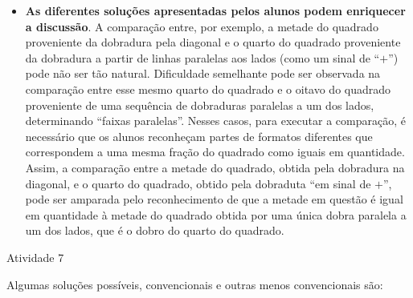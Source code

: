 \begin{multicols}{2}
\begin{itemize}
    \item             {\bf As diferentes soluções apresentadas pelos alunos podem enriquecer a discussão}. A comparação entre, por exemplo, a metade do quadrado proveniente da dobradura pela diagonal e o quarto do quadrado proveniente da dobradura a partir de linhas paralelas aos lados (como um sinal de       ``$+$'') pode não ser tão natural. Dificuldade semelhante pode ser observada na comparação entre esse mesmo quarto do quadrado e o oitavo do quadrado proveniente de uma sequência de dobraduras paralelas a um dos lados, determinando       ``faixas paralelas''. Nesses casos, para executar a comparação, é necessário que os alunos reconheçam partes de formatos diferentes que correspondem a uma mesma fração do quadrado como iguais em quantidade. Assim, a comparação entre a metade do quadrado, obtida pela dobradura na diagonal, e o quarto do quadrado, obtido pela dobraduta       ``em sinal de $+$'', pode ser amparada pelo reconhecimento de que a metade em questão é igual em quantidade à metade do quadrado obtida por uma única dobra paralela a um dos lados, que é o dobro do quarto do quadrado.
\end{itemize} %

\begin{resposta*}{Atividade 7}

  Algumas soluções possíveis, convencionais e outras menos convencionais são:


\end{resposta*}
\end{multicols}
